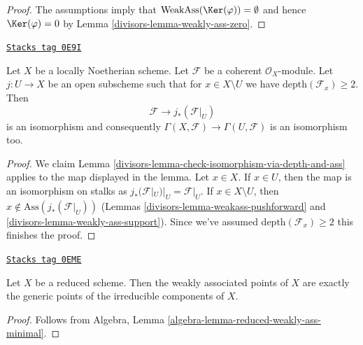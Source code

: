 \begin{proof}

The assumptions imply that $\text{WeakAss}(\Ker(\varphi)) = \emptyset$
and hence $\Ker(\varphi) = 0$ by Lemma \ref{divisors-lemma-weakly-ass-zero}.
\end{proof}

\begin{lemma}
\label{divisors-lemma-depth-2-hartog}
\href{https://stacks.math.columbia.edu/tag/0E9I}{\texttt{Stacks tag 0E9I}}

Let $X$ be a locally Noetherian scheme. Let $\mathcal{F}$
be a coherent $\mathcal{O}_X$-module. Let $j : U \to X$
be an open subscheme such that for $x \in X \setminus U$
we have $\text{depth}(\mathcal{F}_x) \geq 2$. Then
$$
\mathcal{F} \longrightarrow j_*(\mathcal{F}|_U)
$$
is an isomorphism and consequently
$\Gamma(X, \mathcal{F}) \to \Gamma(U, \mathcal{F})$
is an isomorphism too.
\end{lemma}

\begin{proof}

We claim Lemma \ref{divisors-lemma-check-isomorphism-via-depth-and-ass}
applies to the map displayed in the lemma.
Let $x \in X$. If $x \in U$, then the map is an
isomorphism on stalks as $j_*(\mathcal{F}|_U)|_U = \mathcal{F}|_U$.
If $x \in X \setminus U$, then $x \not \in \text{Ass}(j_*(\mathcal{F}|_U))$
(Lemmas \ref{divisors-lemma-weakass-pushforward} and \ref{divisors-lemma-weakly-ass-support}).
Since we've assumed $\text{depth}(\mathcal{F}_x) \geq 2$
this finishes the proof.
\end{proof}

\begin{lemma}
\label{divisors-lemma-weakass-reduced}
\href{https://stacks.math.columbia.edu/tag/0EME}{\texttt{Stacks tag 0EME}}

Let $X$ be a reduced scheme. Then the weakly associated points of $X$
are exactly the generic points of the irreducible components of $X$.
\end{lemma}

\begin{proof}
Follows from Algebra, Lemma \ref{algebra-lemma-reduced-weakly-ass-minimal}.
\end{proof}

